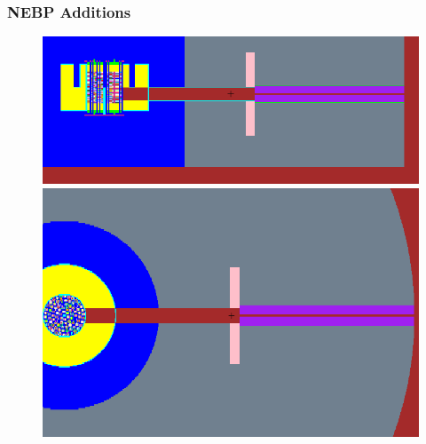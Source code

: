 \documentclass[fleqn]{beamer}
\begin{document}
\begin{frame}
\frametitle{NEBP Additions}

\begin{figure}
\centering
\includegraphics[trim=0 40 0 20, clip, width = .9\textwidth]{mcnp_newxz}\\
\includegraphics[trim=0 120 0 120, clip, width = .9\textwidth]{mcnp_newxy}
\caption{}
\end{figure}

\end{frame}
\end{document}
